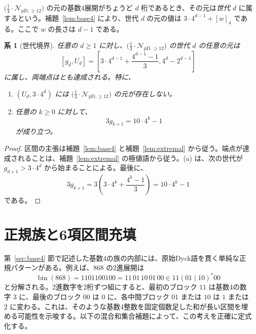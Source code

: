\documentclass[12pt]{ltjsarticle}
\theoremstyle{plain}
\newtheorem{corollary}[theorem]{系}
\theoremstyle{definition}
\theoremstyle{plain}
\newcommand{\Pset}{%
  \bigl(\tfrac{1}{4}\cdot\mathcal{N}_{\mathrm{pD},\geq 12}\bigr)%
}
\begin{document}
$\Pset$ の元の基数4展開がちょうど $d$ 桁であるとき、その元は\emph{世代 $d$} に属するという。補題~\ref{lem:base4} により、世代 $d$ の元の値は $3\cdot4^{d-1}+[w]_4$ である。ここで $w$ の長さは $d-1$ である。

\begin{corollary}[世代境界]\label{cor:gen}
任意の $d\geq1$ に対し、$\Pset$ の世代 $d$ の任意の元は
\begin{equation}\label{eq:generation-interval}
  [g_d,U_d]
  =\left[
  3\cdot4^{d-1}+\frac{4^{d-1}-1}{3},
  4^d-2^{d-1}
  \right]
\end{equation}
に属し、両端点はとも達成される。特に、
\begin{enumerate}[label=\textup{(\alph*)}]
\item $(U_d,3\cdot4^d)$ には $\Pset$ の元が存在しない。
\item 任意の $k\geq0$ に対して、
\begin{equation}\label{eq:three-g}
  3g_{k+1}=10\cdot4^k-1
\end{equation}
が成り立つ。
\end{enumerate}
\end{corollary}

\begin{proof}
区間の主張は補題~\ref{lem:base4} と補題~\ref{lem:extremal} から従う。端点が達成されることは、補題~\ref{lem:extremal} の極値語から従う。(a) は、次の世代が $g_{d+1}>3\cdot4^d$ から始まることによる。最後に、
\[
  3g_{k+1}
  =3\left(3\cdot4^k+\frac{4^k-1}{3}\right)
  =10\cdot4^k-1
\]
である。
\end{proof}

\section{正規族と6項区間充填}\label{sec:regular}

第~\ref{sec:base4} 節で記述した基数4の族の内部には、原始Dyck語を貫く単純な正規パターンがある。例えば、$868$ の2進展開は
\[
 \operatorname{bin}(868)=1101100100=11\,01\,10\,01\,00
 \in 11(01\mid10)^*00
\]
と分解される。2進数字を2桁ずつ組にすると、最初のブロック $11$ は基数4の数字 $3$ に、最後のブロック $00$ は $0$ に、各中間ブロック $01$ または $10$ は $1$ または $2$ に変わる。これは、そのような基数4整数を固定個数足した和が長い区間を埋める可能性を示唆する。以下の混合和集合補題によって、この考えを正確に定式化する。
\end{document}
